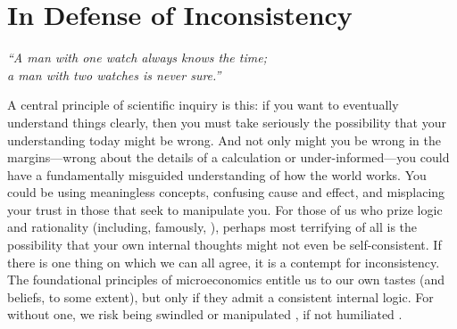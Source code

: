 

\section{In Defense of Inconsistency}

\begin{center}
    \noindent\singlespacingplus
    \it
    ``A man with one watch always knows the time;\\
    a man with two watches is never sure.''
    \citep{segal-law}
\end{center}

%
A central principle of scientific inquiry is this:
    if you want to eventually understand things clearly, then you must take seriously the possibility that your understanding today might be wrong. 
And not only might you be wrong in the margins---wrong about the details of a calculation or under-informed---you could have a fundamentally misguided understanding of how the world works. You could be using meaningless concepts, confusing cause and effect, and misplacing your trust in those that seek to manipulate you. 
For those of us who prize logic and rationality (including, famously, 
\citet{descartes}),
perhaps most terrifying of all is the possibility that your own internal thoughts might not even be self-consistent.
If there is one thing on which we can all agree, it is a contempt for inconsistency.
The foundational principles of microeconomics entitle us to our own tastes (and beliefs, to some extent), but only if they admit a consistent internal logic.
For without one, we risk being swindled \citep{RAT} or manipulated \citep{explosion}, if not humiliated \citep{logicalfalacy,emptysetthesis,politicians}.


